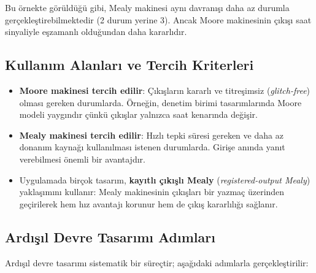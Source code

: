 Bu örnekte görüldüğü gibi, Mealy makinesi aynı davranışı daha az durumla gerçekleştirebilmektedir (2 durum yerine 3). Ancak Moore makinesinin çıkışı saat sinyaliyle eşzamanlı olduğundan daha kararlıdır.

\subsection{Kullanım Alanları ve Tercih Kriterleri}

\begin{itemize}
    \item \textbf{Moore makinesi tercih edilir}: Çıkışların kararlı ve titreşimsiz (\emph{glitch-free}) olması gereken durumlarda. Örneğin, denetim birimi tasarımlarında Moore modeli yaygındır çünkü çıkışlar yalnızca saat kenarında değişir.
    \item \textbf{Mealy makinesi tercih edilir}: Hızlı tepki süresi gereken ve daha az donanım kaynağı kullanılması istenen durumlarda. Girişe anında yanıt verebilmesi önemli bir avantajdır.
    \item Uygulamada birçok tasarım, \textbf{kayıtlı çıkışlı Mealy} (\emph{registered-output Mealy}) yaklaşımını kullanır: Mealy makinesinin çıkışları bir yazmaç üzerinden geçirilerek hem hız avantajı korunur hem de çıkış kararlılığı sağlanır.
\end{itemize}

\subsection{Ardışıl Devre Tasarımı Adımları}

Ardışıl devre tasarımı sistematik bir süreçtir; aşağıdaki adımlarla gerçekleştirilir:

